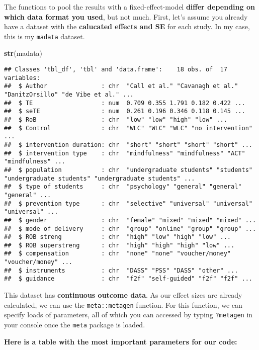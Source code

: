 \documentclass[]{book}
\newenvironment{Shaded}{\begin{snugshade}}{\end{snugshade}}
\newcommand{\KeywordTok}[1]{\textcolor[rgb]{0.13,0.29,0.53}{\textbf{#1}}}
\newcommand{\NormalTok}[1]{#1}
\theoremstyle{definition}
\theoremstyle{definition}
\theoremstyle{definition}
\theoremstyle{remark}
\begin{document}
The functions to pool the results with a fixed-effect-model
\textbf{differ depending on which data format you used}, but not much.
First, let's assume you already have a dataset with the
\textbf{calucated effects and SE} for each study. In my case, this is my
\texttt{madata} dataset.

\begin{Shaded}
\begin{Highlighting}[]
\KeywordTok{str}\NormalTok{(madata)}
\end{Highlighting}
\end{Shaded}

\begin{verbatim}
## Classes 'tbl_df', 'tbl' and 'data.frame':    18 obs. of  17 variables:
##  $ Author               : chr  "Call et al." "Cavanagh et al." "DanitzOrsillo" "de Vibe et al." ...
##  $ TE                   : num  0.709 0.355 1.791 0.182 0.422 ...
##  $ seTE                 : num  0.261 0.196 0.346 0.118 0.145 ...
##  $ RoB                  : chr  "low" "low" "high" "low" ...
##  $ Control              : chr  "WLC" "WLC" "WLC" "no intervention" ...
##  $ intervention duration: chr  "short" "short" "short" "short" ...
##  $ intervention type    : chr  "mindfulness" "mindfulness" "ACT" "mindfulness" ...
##  $ population           : chr  "undergraduate students" "students" "undergraduate students" "undergraduate students" ...
##  $ type of students     : chr  "psychology" "general" "general" "general" ...
##  $ prevention type      : chr  "selective" "universal" "universal" "universal" ...
##  $ gender               : chr  "female" "mixed" "mixed" "mixed" ...
##  $ mode of delivery     : chr  "group" "online" "group" "group" ...
##  $ ROB streng           : chr  "high" "low" "high" "low" ...
##  $ ROB superstreng      : chr  "high" "high" "high" "low" ...
##  $ compensation         : chr  "none" "none" "voucher/money" "voucher/money" ...
##  $ instruments          : chr  "DASS" "PSS" "DASS" "other" ...
##  $ guidance             : chr  "f2f" "self-guided" "f2f" "f2f" ...
\end{verbatim}

This dataset has \textbf{continuous outcome data}. As our effect sizes
are already calculated, we can use the \texttt{meta::metagen} function.
For this function, we can specify loads of parameters, all of which you
can accessed by typing \texttt{?metagen} in your console once the
\texttt{meta} package is loaded.

\textbf{Here is a table with the most important parameters for our
code:}
\end{document}
